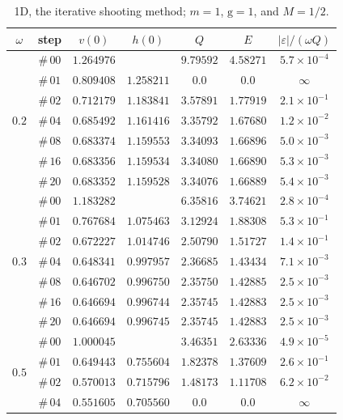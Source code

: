 \documentclass[12pt]{extarticle}
\newcommand{\coupling}{\mathrm{g}}
\theoremstyle{plain}
\theoremstyle{remark}
\begin{document}
\begin{table}[!ht]
\begin{center}
\caption{\footnotesize
1D, the iterative shooting method; $m=1$, $\coupling=1$, and $M=1/2$.
}
\begin{tabular}{ccccccc} \toprule
$\omega$ & step & $v(0)$ & $h(0)$ & $Q$ & $E$ & $|\varepsilon|/(\omega Q)$\\
\midrule
\multirow{7}{*}{$0.2$} & $\#\,00$ & $1.264976$ &  & $9.79592$ & $4.58271$ & $5.7\times10^{-4}$ \\
 & $\#\,01$ & $0.809408$ & $1.258211$ & $0.0$ & $0.0$ & $\infty$ \\
 & $\#\,02$ & $0.712179$ & $1.183841$ & $3.57891$ & $1.77919$ & $2.1\times10^{-1}$ \\
 & $\#\,04$ & $0.685492$ & $1.161416$ & $3.35792$ & $1.67680$ & $1.2\times10^{-2}$ \\
 & $\#\,08$ & $0.683374$ & $1.159553$ & $3.34093$ & $1.66896$ & $5.0\times10^{-3}$ \\
 & $\#\,16$ & $0.683356$ & $1.159534$ & $3.34080$ & $1.66890$ & $5.3\times10^{-3}$ \\
 & $\#\,20$ & $0.683352$ & $1.159528$ & $3.34076$ & $1.66889$ & $5.4\times10^{-3}$ \\
\midrule
\multirow{7}{*}{$0.3$} & $\#\,00$ & $1.183282$ &  & $6.35816$ & $3.74621$ & $2.8\times10^{-4}$ \\
 & $\#\,01$ & $0.767684$ & $1.075463$ & $3.12924$ & $1.88308$ & $5.3\times10^{-1}$ \\
 & $\#\,02$ & $0.672227$ & $1.014746$ & $2.50790$ & $1.51727$ & $1.4\times10^{-1}$ \\
 & $\#\,04$ & $0.648341$ & $0.997957$ & $2.36685$ & $1.43434$ & $7.1\times10^{-3}$ \\
 & $\#\,08$ & $0.646702$ & $0.996750$ & $2.35750$ & $1.42885$ & $2.5\times10^{-3}$ \\
 & $\#\,16$ & $0.646694$ & $0.996744$ & $2.35745$ & $1.42883$ & $2.5\times10^{-3}$ \\
 & $\#\,20$ & $0.646694$ & $0.996745$ & $2.35745$ & $1.42883$ & $2.5\times10^{-3}$ \\
\midrule
\multirow{7}{*}{$0.5$} & $\#\,00$ & $1.000045$ &  & $3.46351$ & $2.63336$ & $4.9\times10^{-5}$ \\
 & $\#\,01$ & $0.649443$ & $0.755604$ & $1.82378$ & $1.37609$ & $2.6\times10^{-1}$ \\
 & $\#\,02$ & $0.570013$ & $0.715796$ & $1.48173$ & $1.11708$ & $6.2\times10^{-2}$ \\
 & $\#\,04$ & $0.551605$ & $0.705560$ & $0.0$ & $0.0$ & $\infty$ \\

\end{tabular}
\end{center}
\end{table}
\end{document}
